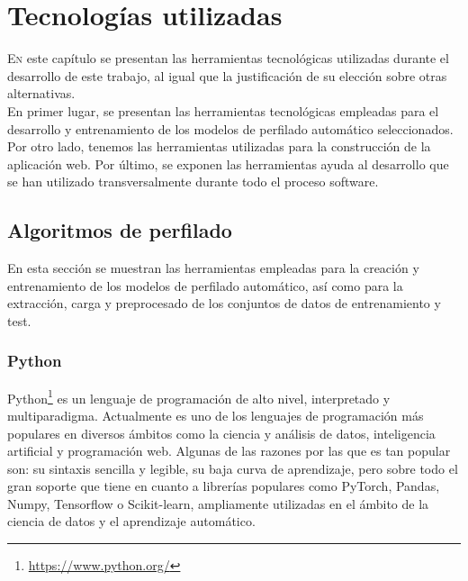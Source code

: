 \chapter{Tecnologías utilizadas}
\label{chap:tecnologias}
\lettrine{E}{n} este capítulo se presentan las herramientas tecnológicas utilizadas durante el desarrollo de este trabajo, al igual que la justificación de su elección sobre otras alternativas.\\
En primer lugar, se presentan las herramientas tecnológicas empleadas para el desarrollo y entrenamiento de los modelos de perfilado automático seleccionados. Por otro lado, tenemos las herramientas utilizadas para la construcción de la aplicación web. Por último, se exponen las herramientas ayuda al desarrollo que se han utilizado transversalmente durante todo el proceso software.\\

\section{Algoritmos de perfilado}
En esta sección se muestran las herramientas empleadas para la creación y entrenamiento de los modelos de perfilado automático, así como para la extracción, carga y preprocesado de los conjuntos de datos de entrenamiento y test.
\subsection{Python}
\label{subsec:python}
Python\footnote{\url{https://www.python.org/}} es un lenguaje de programación de alto nivel, interpretado y multiparadigma. Actualmente es uno de los lenguajes de programación más populares en diversos ámbitos como la ciencia y análisis de datos, inteligencia artificial y programación web. Algunas de las razones por las que es tan popular son: su sintaxis sencilla y legible, su baja curva de aprendizaje, pero sobre todo el gran soporte que tiene en cuanto a librerías populares como PyTorch, Pandas, Numpy, Tensorflow o Scikit-learn, ampliamente utilizadas en el ámbito de la ciencia de datos y el aprendizaje automático.\\
